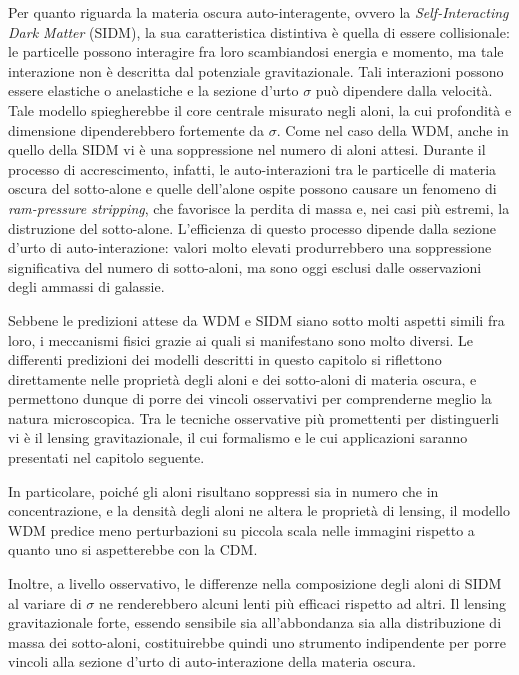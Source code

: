 Per quanto riguarda la materia oscura auto-interagente, ovvero la \emph{Self-Interacting Dark Matter} (SIDM), la sua caratteristica distintiva è quella di essere collisionale: le particelle possono interagire fra loro scambiandosi energia e momento, ma tale interazione non è descritta dal potenziale gravitazionale. Tali interazioni possono essere elastiche o anelastiche e la sezione d'urto $\sigma$ può dipendere dalla velocità. Tale modello spiegherebbe il core centrale misurato negli aloni, la cui profondità e dimensione dipenderebbero fortemente da $\sigma$.
Come nel caso della WDM, anche in quello della SIDM vi è una soppressione nel numero di aloni attesi. Durante il processo di accrescimento, infatti, le auto-interazioni tra le particelle di materia oscura del sotto-alone e quelle dell'alone ospite possono causare un fenomeno di \textit{ram-pressure stripping}, che favorisce la perdita di massa e, nei casi più estremi, la distruzione del sotto-alone. L'efficienza di questo processo dipende dalla sezione d'urto di auto-interazione: valori molto elevati produrrebbero una soppressione significativa del numero di sotto-aloni, ma sono oggi esclusi dalle osservazioni degli ammassi di galassie.

Sebbene le predizioni attese da WDM e SIDM siano sotto molti aspetti simili fra loro, i meccanismi fisici grazie ai quali si manifestano sono molto diversi.
Le differenti predizioni dei modelli descritti in questo capitolo si riflettono direttamente nelle proprietà degli aloni e dei sotto-aloni di materia oscura, e permettono dunque di porre dei vincoli osservativi per comprenderne meglio la natura microscopica. Tra le tecniche osservative più promettenti per distinguerli vi è il lensing gravitazionale, il cui formalismo e le cui applicazioni saranno presentati nel capitolo seguente. 

In particolare, poiché gli aloni risultano soppressi sia in numero che in concentrazione, e la densità degli aloni ne altera le proprietà di lensing, il modello WDM predice meno perturbazioni su piccola scala nelle immagini rispetto a quanto uno si aspetterebbe con la CDM.

Inoltre,  a livello osservativo, le differenze nella composizione degli aloni di SIDM al variare di $\sigma$ ne renderebbero alcuni lenti più efficaci rispetto ad altri.
 Il lensing gravitazionale forte, essendo sensibile sia all'abbondanza sia alla distribuzione di massa dei sotto-aloni, costituirebbe quindi uno strumento indipendente per porre vincoli alla sezione d'urto di auto-interazione della materia oscura.


